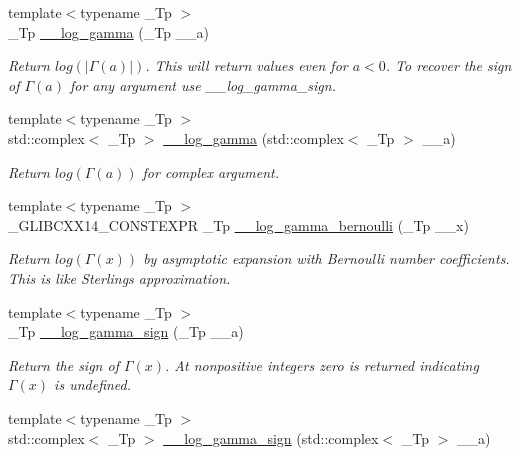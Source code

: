 \begin{DoxyCompactItemize}
{\footnotesize template$<$typename \+\_\+\+Tp $>$ }\\\+\_\+\+Tp \hyperlink{namespacestd_1_1____detail_af6c4c0192a07f467fd9ddeebb28a34d4}{\+\_\+\+\_\+log\+\_\+gamma} (\+\_\+\+Tp \+\_\+\+\_\+a)
\begin{DoxyCompactList}\small\item\em Return $ log(|\Gamma(a)|) $. This will return values even for $ a < 0 $. To recover the sign of $ \Gamma(a) $ for any argument use {\itshape \+\_\+\+\_\+log\+\_\+gamma\+\_\+sign}. \end{DoxyCompactList}\item 
{\footnotesize template$<$typename \+\_\+\+Tp $>$ }\\std\+::complex$<$ \+\_\+\+Tp $>$ \hyperlink{namespacestd_1_1____detail_ad37ad67a4b856eb97b13c8844f9ef8d8}{\+\_\+\+\_\+log\+\_\+gamma} (std\+::complex$<$ \+\_\+\+Tp $>$ \+\_\+\+\_\+a)
\begin{DoxyCompactList}\small\item\em Return $ log(\Gamma(a)) $ for complex argument. \end{DoxyCompactList}\item 
{\footnotesize template$<$typename \+\_\+\+Tp $>$ }\\\+\_\+\+G\+L\+I\+B\+C\+X\+X14\+\_\+\+C\+O\+N\+S\+T\+E\+X\+PR \+\_\+\+Tp \hyperlink{namespacestd_1_1____detail_ac13e31ebcd3c99d6a7cad9010e039315}{\+\_\+\+\_\+log\+\_\+gamma\+\_\+bernoulli} (\+\_\+\+Tp \+\_\+\+\_\+x)
\begin{DoxyCompactList}\small\item\em Return $log(\Gamma(x))$ by asymptotic expansion with Bernoulli number coefficients. This is like Sterling\textquotesingle{}s approximation. \end{DoxyCompactList}\item 
{\footnotesize template$<$typename \+\_\+\+Tp $>$ }\\\+\_\+\+Tp \hyperlink{namespacestd_1_1____detail_ab17ef141874b20a302d5c142cf304542}{\+\_\+\+\_\+log\+\_\+gamma\+\_\+sign} (\+\_\+\+Tp \+\_\+\+\_\+a)
\begin{DoxyCompactList}\small\item\em Return the sign of $ \Gamma(x) $. At nonpositive integers zero is returned indicating $ \Gamma(x) $ is undefined. \end{DoxyCompactList}\item 
{\footnotesize template$<$typename \+\_\+\+Tp $>$ }\\std\+::complex$<$ \+\_\+\+Tp $>$ \hyperlink{namespacestd_1_1____detail_a4c87b679d9fa1ac20ebe3cb85becb266}{\+\_\+\+\_\+log\+\_\+gamma\+\_\+sign} (std\+::complex$<$ \+\_\+\+Tp $>$ \+\_\+\+\_\+a)

\end{DoxyCompactItemize}
